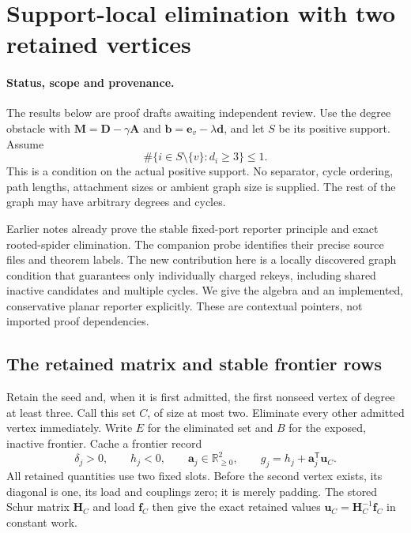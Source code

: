 \section{Support-local elimination with two retained vertices}
\label{sec:op3-two-port-frontier}

\paragraph{Status, scope and provenance.}
The results below are \statusproved{} proof drafts awaiting independent
review. Use the degree obstacle with
$\bm M=\bm D-\gamma\bm A$ and
$\bm b=\bm e_v-\lambda\bm d$, and let $S$ be its positive support.
Assume
\begin{equation}
 \#\{i\in S\setminus\{v\}:d_i\geq3\}\leq1.
 \label{eq:op3-two-port-promise}
\end{equation}
This is a condition on the actual positive support. No separator, cycle
ordering, path lengths, attachment sizes or ambient graph size is supplied.
The rest of the graph may have arbitrary degrees and cycles.

Earlier notes already prove the stable fixed-port reporter principle
and exact rooted-spider elimination. The companion probe identifies their
precise source files and theorem labels. The new contribution here is a locally
discovered graph condition that guarantees only individually charged rekeys,
including shared inactive candidates and multiple cycles. We give the
algebra and an implemented, conservative planar reporter explicitly. These
are contextual pointers, not imported proof dependencies.

\subsection{The retained matrix and stable frontier rows}

Retain the seed and, when it is first admitted, the first nonseed vertex
of degree at least three. Call this set $C$, of size at most two. Eliminate
every other admitted vertex immediately. Write $E$ for the eliminated set
and $B$ for the exposed, inactive frontier. Cache a frontier record
\begin{equation}
 \delta_j>0,\qquad h_j<0,\qquad \bm a_j\in\mathbb R^2_{\geq0},
 \qquad g_j=h_j+\bm a_j^{\mathsf T}\bm u_C.
 \label{eq:op3-two-port-row}
\end{equation}
All retained quantities use two fixed slots. Before the second vertex
exists, its diagonal is one, its load and couplings zero; it is merely
padding. The stored Schur matrix $\bm H_C$ and load $\bm f_C$ then give the
exact retained values $\bm u_C=\bm H_C^{-1}\bm f_C$ in constant work.

